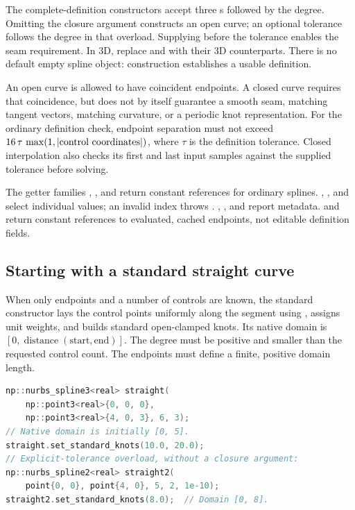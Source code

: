 The complete-definition constructors accept three s followed
by the degree. Omitting the closure argument constructs an open curve; an
optional tolerance follows the degree in that overload. Supplying
 before the tolerance enables the seam requirement. In 3D, replace
 and  with their 3D counterparts. There is no
default empty spline object: construction establishes a usable definition.

An open curve is allowed to have coincident endpoints. A closed curve requires
that coincidence, but does not by itself guarantee a smooth seam, matching
tangent vectors, matching curvature, or a periodic knot representation. For
the ordinary definition check, endpoint separation must not exceed
$16\,\tau\,\max(1,|\hbox{control coordinates}|)$, where $\tau$ is the definition
tolerance. Closed interpolation also checks its first and last input samples
against the supplied tolerance before solving.

The getter families , , and
 return constant references for ordinary splines.
, , and  select
individual values; an invalid index throws .
, , and  report metadata.
 and  return constant references to evaluated,
cached endpoints, not editable definition fields.

\subsection{Starting with a standard straight curve}

When only endpoints and a number of controls are known, the standard
constructor lays the control points uniformly along the segment using
, assigns unit weights, and builds standard open-clamped knots. Its
native domain is $[0,\operatorname{distance}(\mathrm{start},\mathrm{end})]$.
The degree must be positive and smaller than the requested control count.
The endpoints must define a finite, positive domain length.

\begin{lstlisting}[language=C++,caption={Standard construction and knot replacement.}]
np::nurbs_spline3<real> straight(
    np::point3<real>{0, 0, 0},
    np::point3<real>{4, 0, 3}, 6, 3);
// Native domain is initially [0, 5].
straight.set_standard_knots(10.0, 20.0);
// Explicit-tolerance overload, without a closure argument:
np::nurbs_spline2<real> straight2(
    point{0, 0}, point{4, 0}, 5, 2, 1e-10);
straight2.set_standard_knots(8.0);  // Domain [0, 8].
\end{lstlisting}

